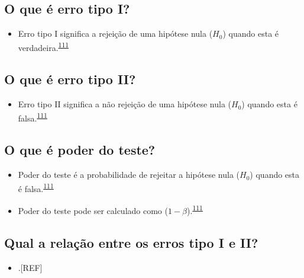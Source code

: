 \documentclass[
]{book}
\providecommand{\tightlist}{%
  \setlength{\itemsep}{0pt}\setlength{\parskip}{0pt}}
\begin{document}
\hypertarget{o-que-uxe9-erro-tipo-i}{%
\subsection{O que é erro tipo I?}\label{o-que-uxe9-erro-tipo-i}}

\begin{itemize}
\tightlist
\item
  Erro tipo I significa a rejeição de uma hipótese nula (\(H_{0}\)) quando esta é verdadeira.\textsuperscript{\protect\hyperlink{ref-Curran-Everett2009}{111}}
\end{itemize}

\hypertarget{o-que-uxe9-erro-tipo-ii}{%
\subsection{O que é erro tipo II?}\label{o-que-uxe9-erro-tipo-ii}}

\begin{itemize}
\tightlist
\item
  Erro tipo II significa a não rejeição de uma hipótese nula (\(H_{0}\)) quando esta é falsa.\textsuperscript{\protect\hyperlink{ref-Curran-Everett2009}{111}}
\end{itemize}

\hypertarget{o-que-uxe9-poder-do-teste}{%
\subsection{O que é poder do teste?}\label{o-que-uxe9-poder-do-teste}}

\begin{itemize}
\item
  Poder do teste é a probabilidade de rejeitar a hipótese nula (\(H_{0}\)) quando esta é falsa.\textsuperscript{\protect\hyperlink{ref-Curran-Everett2009}{111}}
\item
  Poder do teste pode ser calculado como (\(1 - \beta\)).\textsuperscript{\protect\hyperlink{ref-Curran-Everett2009}{111}}
\end{itemize}

\hypertarget{qual-a-relauxe7uxe3o-entre-os-erros-tipo-i-e-ii}{%
\subsection{Qual a relação entre os erros tipo I e II?}\label{qual-a-relauxe7uxe3o-entre-os-erros-tipo-i-e-ii}}

\begin{itemize}
\tightlist
\item
  .{[}REF{]}
\end{itemize}
\end{document}
